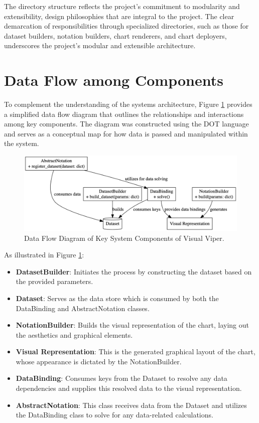 The directory structure reflects the project's commitment to modularity
and extensibility, design philosophies that are integral to the project.
The clear demarcation of responsibilities through specialized
directories, such as those for dataset builders, notation builders,
chart renderers, and chart deployers, underscores the project's modular
and extensible architecture.

\section{Data Flow among
Components}\label{data-flow-among-components}

To complement the understanding of the system\textquotesingle s
architecture, Figure \ref{fig:data_flow} provides a simplified data flow diagram that
outlines the relationships and interactions among key components. The
diagram was constructed using the DOT language and serves as a
conceptual map for how data is passed and manipulated within the system.

\begin{figure}[ht]
  \centering
  \includegraphics[width=\textwidth]{media/fig11.png}
  \caption{Data Flow Diagram of Key System Components of Visual Viper.}
  \label{fig:data_flow}
\end{figure}

As illustrated in Figure \ref{fig:data_flow}:

\begin{itemize}
\item
  \textbf{DatasetBuilder}: Initiates the process by constructing the
  dataset based on the provided parameters.
\item
  \textbf{Dataset}: Serves as the data store which is consumed by both
  the DataBinding and AbstractNotation classes.
\item
  \textbf{NotationBuilder}: Builds the visual representation of the
  chart, laying out the aesthetics and graphical elements.
\item
  \textbf{Visual Representation}: This is the generated graphical layout
  of the chart, whose appearance is dictated by the NotationBuilder.
\item
  \textbf{DataBinding}: Consumes keys from the Dataset to resolve any
  data dependencies and supplies this resolved data to the visual
  representation.
\item
  \textbf{AbstractNotation}: This class receives data from the Dataset
  and utilizes the DataBinding class to solve for any data-related
  calculations.
\end{itemize}

